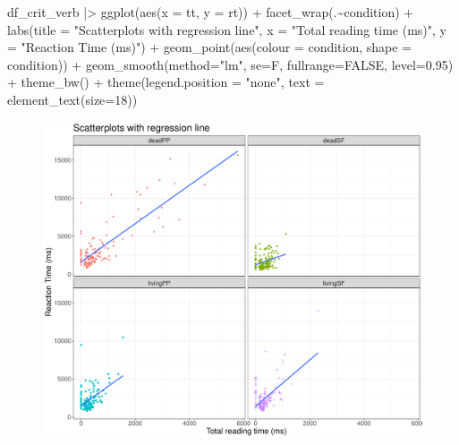 \documentclass[
  letterpaper,
  DIV=11,
  numbers=noendperiod]{scrartcl}
\newenvironment{Shaded}{\begin{snugshade}}{\end{snugshade}}
\newcommand{\AttributeTok}[1]{\textcolor[rgb]{0.40,0.45,0.13}{#1}}
\newcommand{\ConstantTok}[1]{\textcolor[rgb]{0.56,0.35,0.01}{#1}}
\newcommand{\DecValTok}[1]{\textcolor[rgb]{0.68,0.00,0.00}{#1}}
\newcommand{\FloatTok}[1]{\textcolor[rgb]{0.68,0.00,0.00}{#1}}
\newcommand{\FunctionTok}[1]{\textcolor[rgb]{0.28,0.35,0.67}{#1}}
\newcommand{\NormalTok}[1]{\textcolor[rgb]{0.00,0.23,0.31}{#1}}
\newcommand{\SpecialCharTok}[1]{\textcolor[rgb]{0.37,0.37,0.37}{#1}}
\newcommand{\StringTok}[1]{\textcolor[rgb]{0.13,0.47,0.30}{#1}}
\begin{document}
\begin{Shaded}
\begin{Highlighting}[]
\NormalTok{df\_crit\_verb }\SpecialCharTok{|\textgreater{}}
\FunctionTok{ggplot}\NormalTok{(}\FunctionTok{aes}\NormalTok{(}\AttributeTok{x =}\NormalTok{ tt, }\AttributeTok{y =}\NormalTok{ rt)) }\SpecialCharTok{+}
  \FunctionTok{facet\_wrap}\NormalTok{(.}\SpecialCharTok{\textasciitilde{}}\NormalTok{condition) }\SpecialCharTok{+}
  \FunctionTok{labs}\NormalTok{(}\AttributeTok{title =} \StringTok{"Scatterplots with regression line"}\NormalTok{,}
       \AttributeTok{x =} \StringTok{"Total reading time (ms)"}\NormalTok{,}
       \AttributeTok{y =} \StringTok{"Reaction Time (ms)"}\NormalTok{) }\SpecialCharTok{+}
  \FunctionTok{geom\_point}\NormalTok{(}\FunctionTok{aes}\NormalTok{(}\AttributeTok{colour =}\NormalTok{ condition, }\AttributeTok{shape =}\NormalTok{ condition)) }\SpecialCharTok{+}
  \FunctionTok{geom\_smooth}\NormalTok{(}\AttributeTok{method=}\StringTok{"lm"}\NormalTok{, }\AttributeTok{se=}\NormalTok{F, }\AttributeTok{fullrange=}\ConstantTok{FALSE}\NormalTok{, }\AttributeTok{level=}\FloatTok{0.95}\NormalTok{) }\SpecialCharTok{+}
  \FunctionTok{theme\_bw}\NormalTok{() }\SpecialCharTok{+}
  \FunctionTok{theme}\NormalTok{(}\AttributeTok{legend.position =} \StringTok{"none"}\NormalTok{,}
        \AttributeTok{text =} \FunctionTok{element\_text}\NormalTok{(}\AttributeTok{size=}\DecValTok{18}\NormalTok{))}
\end{Highlighting}
\end{Shaded}

\begin{figure}[H]

{\centering \includegraphics{_lin_reg1_files/figure-pdf/unnamed-chunk-6-1.pdf}

}

\end{figure}
\end{document}
